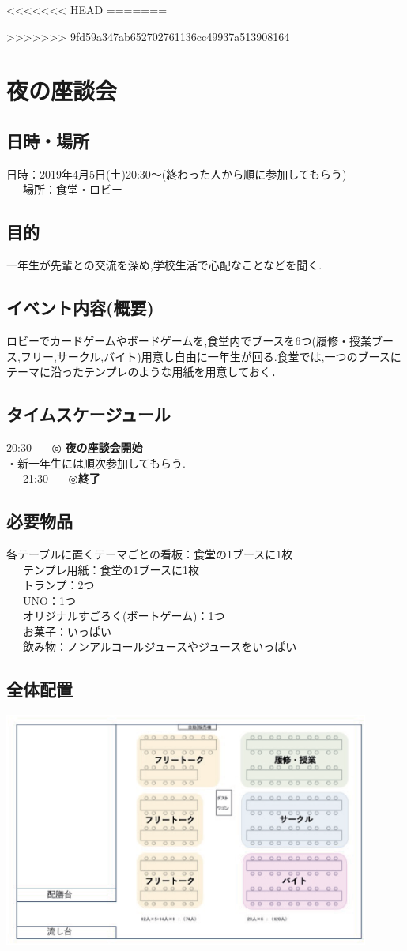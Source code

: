<<<<<<< HEAD
=======

>>>>>>> 9fd59a347ab652702761136cc49937a513908164
\section{夜の座談会}
\subsection{日時・場所}
日時：2019年4月5日(土)20:30〜(終わった人から順に参加してもらう)\\
\ \ \ 場所：食堂・ロビー\\
\subsection{目的}
一年生が先輩との交流を深め,学校生活で心配なことなどを聞く.
\subsection{イベント内容(概要)}
ロビーでカードゲームやボードゲームを,食堂内でブースを6つ(履修・授業ブース,フリー,サークル,バイト)用意し自由に一年生が回る.食堂では,一つのブースに
テーマに沿ったテンプレのような用紙を用意しておく．
\subsection{タイムスケージュール}
20:30 \ \ \ ◎ \textbf{夜の座談会開始}\\
\hspace{15mm}・新一年生には順次参加してもらう.\\
\ \ \ 21:30 \ \ \ ◎\textbf{終了}
\subsection{必要物品}
各テーブルに置くテーマごとの看板：食堂の1ブースに1枚\\
\ \ \ テンプレ用紙：食堂の1ブースに1枚\\
\ \ \ トランプ：2つ\\
\ \ \ UNO：1つ\\
\ \ \ オリジナルすごろく(ボートゲーム)：1つ\\
\ \ \ お菓子：いっぱい\\
\ \ \ 飲み物：ノンアルコールジュースやジュースをいっぱい
\subsection{全体配置}
\begin{center}
\includegraphics[width=12cm]{./13/hone.eps}
\end{center}

